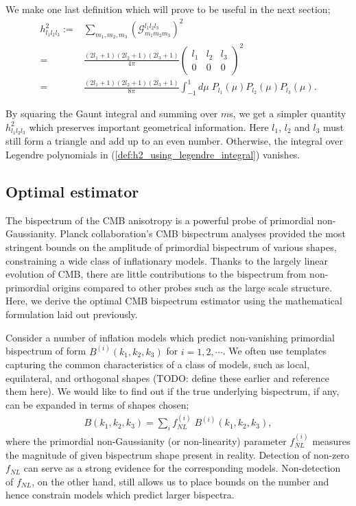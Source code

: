 We make one last definition which will prove to be useful in the next section;
\begin{align}
	h^2_{l_1 l_2 l_3} :=& \sum_{m_1, m_2, m_3} \left( \mathcal{G}^{l_1 l_2 l_3}_{m_1 m_2 m_3} \right)^2  \label{def:h2_using_gaunt_integral}\\
	=& \frac{(2l_1+1)(2l_2+1)(2l_3+1)}{4\pi} { \begin{pmatrix}	l_1 & l_2 & l_3 \\ 0 & 0 & 0 \end{pmatrix} }^2 \\
	=& \frac{(2l_1+1)(2l_2+1)(2l_3+1)}{8\pi} \int_{-1}^{1} d\mu \; P_{l_1}(\mu) P_{l_2}(\mu) P_{l_3}(\mu). \label{def:h2_using_legendre_integral}
\end{align}

By squaring the Gaunt integral and summing over $m$s, we get a simpler quantity $h^2_{l_1 l_2 l_3}$ which preserves important geometrical information. Here $l_1$, $l_2$ and $l_3$ must still form a triangle and add up to an even number. Otherwise, the integral over Legendre polynomials in (\ref{def:h2_using_legendre_integral}) vanishes.

\subsection{Optimal estimator}
The bispectrum of the CMB anisotropy is a powerful probe of primordial non-Gaussianity. Planck collaboration's CMB bispectrum analyses provided the most stringent bounds on the amplitude of primordial bispectrum of various shapes, constraining a wide class of inflationary models. Thanks to the largely linear evolution of CMB, there are little contributions to the bispectrum from non-primordial origins compared to other probes such as the large scale structure. Here, we derive the optimal CMB bispectrum estimator using the mathematical formulation laid out previously.

Consider a number of inflation models which predict non-vanishing primordial bispectrum of form $B^{(i)}(k_1,k_2,k_3)$ for $i=1,2,\cdots$. We often use templates capturing the common characteristics of a class of models, such as local, equilateral, and orthogonal shapes (TODO: define these earlier and reference them here). We would like to find out if the true underlying bispectrum, if any, can be expanded in terms of shapes chosen;
\begin{align}
	B(k_1,k_2,k_3) = \sum_i f_{NL}^{(i)} \; B^{(i)}(k_1,k_2,k_3), \label{eqn:primordial_bispectrum_fNLs}
\end{align}
where the primordial non-Gaussianity (or non-linearity) parameter $f^{(i)}_{NL}$ measures the magnitude of given bispectrum shape present in reality. Detection of non-zero $f_{NL}$ can serve as a strong evidence for the corresponding models. Non-detection of $f_{NL}$, on the other hand, still allows us to place bounds on the number and hence constrain models which predict larger bispectra.

